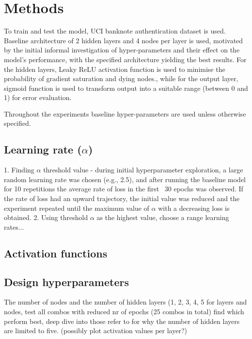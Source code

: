 \documentclass{article}
\begin{document}
\section{Methods}

To train and test the model, UCI banknote authentication dataset is used.
Baseline architecture of 2 hidden layers and 4 nodes per layer is used, motivated by the initial informal investigation of hyper-parameters and their effect on the model's performance, with the specified architecture yielding the best results.
For the hidden layers, Leaky ReLU activation function is used to minimise the probability of gradient saturation and dying nodes., while for the output layer, sigmoid function is used to transform output into a suitable range (between 0 and 1) for error evaluation.

Throughout the experiments baseline hyper-parameters are used unless otherwise specified.

\subsection{Learning rate ($\alpha$)}

1. Finding $\alpha$ threshold value - during initial hyperparameter exploration, a large random learning rate was chosen (e.g., 2.5), and after running the baseline model for 10 repetitions the average rate of loss in the first ~30 epochs was observed. If the rate of loss had an upward trajectory, the initial value was reduced and the experiment repeated until the maximum value of $\alpha$ with a decreasing loss is obtained.
2. Using threshold $\alpha$ as the highest value, choose a range learning rates...

\subsection{Activation functions}

\subsection{Design hyperparameters}

 The number of nodes and the number of hidden layers (1, 2, 3, 4, 5 for layers and nodes, test all combos with reduced nr of epochs (25 combos in total) find which perform best, deep dive into those refer to \cite{Xavier} for why the number of hidden layers are limited to five. (possibly plot activation values per layer?)
\end{document}
